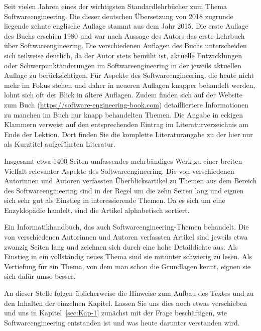\label{sec:Kap-0.3:Sommerville}
{Seit vielen Jahren eines der wichtigsten Standardlehrbücher zum Thema Softwareengineering. Die dieser deutschen Übersetzung von 2018 zugrunde liegende zehnte englische Auflage stammt aus dem Jahr 2015. Die erste Auflage des Buchs erschien 1980 und war nach Aussage des Autors das erste Lehrbuch über Softwareengineering. Die verschiedenen Auflagen des Buchs unterscheiden sich teilweise deutlich, da der Autor stets bemüht ist, aktuelle Entwicklungen oder Schwerpunktänderungen im Softwareengineering in der jeweils aktuellen Auflage zu berücksichtigen. Für Aspekte des Softwareengineering, die heute nicht mehr im Fokus stehen und daher in neueren Auflagen knapper behandelt werden, lohnt sich oft der Blick in ältere Auflagen. Zudem finden sich auf der Website zum Buch (\href{https://software-engineering-book.com}{https://software-engineering-book.com}) detailliertere Informationen zu manchen im Buch nur knapp behandelten Themen.}
{Die Angabe in eckigen Klammern verweist auf den entsprechenden Eintrag im Literaturverzeichnis am Ende der Lektion. Dort finden Sie die komplette Literaturangabe zu der hier nur als Kurztitel aufgeführten Literatur.}

{Insgesamt etwa 1400 Seiten umfassendes mehrbändiges Werk zu einer breiten Vielfalt relevanter Aspekte des Softwareengineering. Die von verschiedenen Autorinnen und Autoren verfassten Überblicksartikel zu Themen aus dem Bereich des Softwareengineering sind in der Regel um die zehn Seiten lang und eignen sich sehr gut als Einstieg in interessierende Themen. Da es sich um eine Enzyklopädie handelt, sind die Artikel alphabetisch sortiert.}

{Ein Informatikhandbuch, das auch Softwareengineering-Themen behandelt. Die von verschiedenen Autorinnen und Autoren verfassten Artikel sind jeweils etwa zwanzig Seiten lang und zeichnen sich durch eine hohe Detaildichte aus. Als Einstieg in ein vollständig neues Thema sind sie mitunter schwierig zu lesen. Als Vertiefung für ein Thema, von dem man schon die Grundlagen kennt, eignen sie sich dafür umso besser.}

An dieser Stelle folgen üblicherweise die Hinweise zum Aufbau des Textes und zu den Inhalten der einzelnen Kapitel. Lassen Sie uns dies noch etwas verschieben und uns in Kapitel~\ref{sec:Kap-1} zunächst mit der Frage beschäftigen, wie Softwareengineering entstanden ist und was heute darunter verstanden wird.

